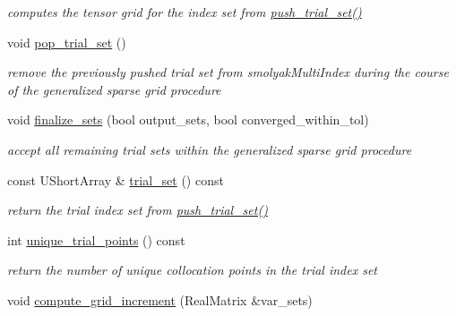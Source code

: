 \begin{DoxyCompactItemize}
\begin{DoxyCompactList}\small\item\em computes the tensor grid for the index set from \hyperlink{classPecos_1_1HierarchSparseGridDriver_a99c17efb3a8e873b7708652cc1787370}{push\+\_\+trial\+\_\+set()} \end{DoxyCompactList}\item 
void \hyperlink{classPecos_1_1HierarchSparseGridDriver_a92b2604a79028bec35c176aee27e56bb}{pop\+\_\+trial\+\_\+set} ()\label{classPecos_1_1HierarchSparseGridDriver_a92b2604a79028bec35c176aee27e56bb}

\begin{DoxyCompactList}\small\item\em remove the previously pushed trial set from smolyak\+Multi\+Index during the course of the generalized sparse grid procedure \end{DoxyCompactList}\item 
void \hyperlink{classPecos_1_1HierarchSparseGridDriver_a07e01bf89eb07535ea78132b8d533088}{finalize\+\_\+sets} (bool output\+\_\+sets, bool converged\+\_\+within\+\_\+tol)\label{classPecos_1_1HierarchSparseGridDriver_a07e01bf89eb07535ea78132b8d533088}

\begin{DoxyCompactList}\small\item\em accept all remaining trial sets within the generalized sparse grid procedure \end{DoxyCompactList}\item 
const U\+Short\+Array \& \hyperlink{classPecos_1_1HierarchSparseGridDriver_a5c92e49dbfbcfa5b0d1523ed254b4d76}{trial\+\_\+set} () const \label{classPecos_1_1HierarchSparseGridDriver_a5c92e49dbfbcfa5b0d1523ed254b4d76}

\begin{DoxyCompactList}\small\item\em return the trial index set from \hyperlink{classPecos_1_1HierarchSparseGridDriver_a99c17efb3a8e873b7708652cc1787370}{push\+\_\+trial\+\_\+set()} \end{DoxyCompactList}\item 
int \hyperlink{classPecos_1_1HierarchSparseGridDriver_a3d8e458c7cf95eae26aa53a738844d89}{unique\+\_\+trial\+\_\+points} () const \label{classPecos_1_1HierarchSparseGridDriver_a3d8e458c7cf95eae26aa53a738844d89}

\begin{DoxyCompactList}\small\item\em return the number of unique collocation points in the trial index set \end{DoxyCompactList}\item 
void \hyperlink{classPecos_1_1HierarchSparseGridDriver_af2bf445b9a8d1f418dc3519a3305b05f}{compute\+\_\+grid\+\_\+increment} (Real\+Matrix \&var\+\_\+sets)\label{classPecos_1_1HierarchSparseGridDriver_af2bf445b9a8d1f418dc3519a3305b05f}


\end{DoxyCompactItemize}
